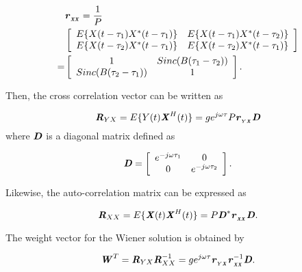 \documentclass[twocolumn]{IEEEtran}
\begin{document}
\begin{align}
&\textbf{\textit{r}}_{{}_{\textbf{\textit{XX}}}}=\frac{1}{P} \nonumber \\
&\left[ {{\begin{array}{*{2}c}
E\{ X(t-\tau_1) X^*(t-\tau_1) \}  & E\{ X(t-\tau_1) X^*(t-\tau_2) \} \\
E\{ X(t-\tau_2) X^*(t-\tau_1) \}  & E\{ X(t-\tau_2) X^*(t-\tau_1) \} \\
\end{array} }}
\right] \nonumber\\
=&\left[ {{\begin{array}{*{2}c}
1                       & Sinc(B(\tau_1-\tau_2)) \\
Sinc(B(\tau_2-\tau_1))  & 1\\
\end{array} }}
\right].
\end{align}

\noindent Then, the cross correlation vector can be written as

\begin{equation}
\textbf{\textit{R}}_{YX}=E\{ Y(t) \textbf{\textit{X}}^H(t)\} = g
e^{j\omega \tau} P \textbf{\textit{r}}_{{}_{Y\textbf{\textit{X}}}}
\textbf{\textit{D}}
\end{equation}
where $\textbf{\textit{D}}$ is a diagonal matrix defined as

\begin{equation}\label{D}
\textbf{\textit{D}}=\left[ {{\begin{array}{*{2}c}
 e^{-j\omega \tau_1}  & 0 \\
0                     & e^{-j\omega \tau_2}  \\
\end{array} }}
\right].
\end{equation}

\noindent Likewise, the auto-correlation matrix can be expressed as

\begin{equation}
\textbf{\textit{R}}_{XX}=E\{ \textbf{\textit{X}}(t)
\textbf{\textit{X}}^H(t)\} = P
\textbf{\textit{D}}^*\textbf{\textit{r}}_{{}_{\textbf{\textit{XX}}}}
\textbf{\textit{D}}. \label{auto}
\end{equation}

The weight vector for the Wiener solution is obtained by

\begin{equation}
\textbf{\textit{W}}^T=\textbf{\textit{R}}_{YX}\textbf{\textit{R}}_{XX}^{-1}
=ge^{j\omega
\tau}\textbf{\textit{r}}_{{}_{Y\textbf{\textit{X}}}}\textbf{\textit{r}}_{{}_{\textbf{\textit{XX}}}}^{-1}\textbf{\textit{D}}.
\end{equation}
\end{document}
